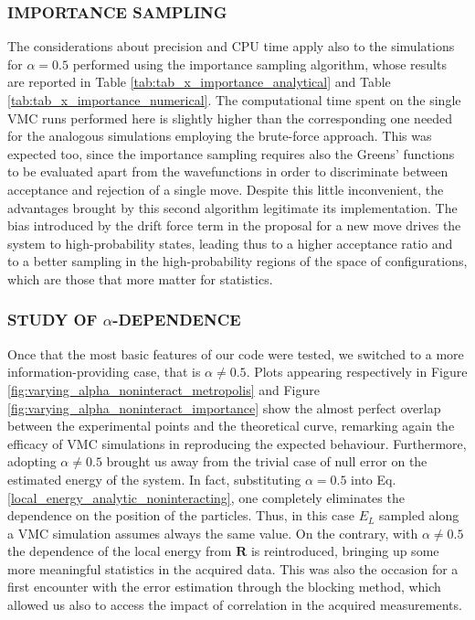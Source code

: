 \subsubsection*{IMPORTANCE SAMPLING}
The considerations about precision and CPU time apply also to the simulations for $\alpha=0.5$ performed using the importance sampling algorithm, whose results are reported in Table \ref{tab:tab_x_importance_analytical} and Table \ref{tab:tab_x_importance_numerical}. The computational time spent on the single VMC runs performed here is slightly higher than the corresponding one needed for the analogous simulations employing the brute-force approach. This was expected too, since the importance sampling requires also the Greens' functions to be evaluated apart from the wavefunctions in order to discriminate between acceptance and rejection of a single move. Despite this little inconvenient, the advantages brought by this second algorithm legitimate its implementation. The bias introduced by the drift force term in the proposal for a new move drives the system to high-probability states, leading thus to a higher acceptance ratio and to a better sampling in the high-probability regions of the space of configurations, which are those that more matter for statistics. \\

\subsubsection*{STUDY OF $\alpha$-DEPENDENCE}
Once that the most basic features of our code were tested, we switched to a more information-providing case, that is $\alpha\neq 0.5$. Plots appearing respectively in Figure \ref{fig:varying_alpha_noninteract_metropolis} and Figure \ref{fig:varying_alpha_noninteract_importance} show the almost perfect overlap between the experimental points and the theoretical curve, remarking again the efficacy of VMC simulations in reproducing the expected behaviour. Furthermore, adopting $\alpha\neq0.5$ brought us away from the trivial case of null error on the estimated energy of the system. In fact, substituting $\alpha=0.5$ into Eq.\,\ref{local_energy_analytic_noninteracting}, one completely eliminates the dependence on the position of the particles. Thus, in this case $E_L$ sampled along a VMC simulation assumes always the same value. On the contrary, with $\alpha\neq0.5$ the dependence of the local energy from $\bm{R}$ is reintroduced, bringing up some more meaningful statistics in the acquired data. This was also the occasion for a first encounter with the error estimation through the blocking method, which allowed us also to access the impact of correlation in the acquired measurements. 

